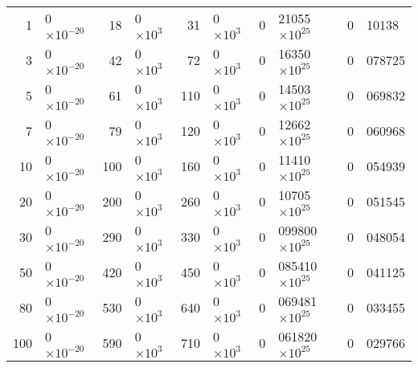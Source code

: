 \documentclass{warpdoc}
\begin{document}
\begin{table}
\begin{threeparttable}
\begin{tabular}{r@{.}lr@{.}lr@{.}lr@{.}lr@{.}l}
     1&0 $\times 10^{-20}$  & 18&0 $\times 10^{3}$  & 31&0 $\times 10^{3}$ &  0&21055 $\times 10^{25}$ &  0&10138\\
     3&0 $\times 10^{-20}$  & 42&0 $\times 10^{3}$  & 72&0 $\times 10^{3}$ &  0&16350 $\times 10^{25}$ &  0&078725\\
     5&0 $\times 10^{-20}$  & 61&0 $\times 10^{3}$  &110&0 $\times 10^{3}$ &  0&14503 $\times 10^{25}$ &  0&069832\\
     7&0 $\times 10^{-20}$  & 79&0 $\times 10^{3}$  &120&0 $\times 10^{3}$ &  0&12662 $\times 10^{25}$ &  0&060968\\
    10&0 $\times 10^{-20}$  &100&0 $\times 10^{3}$  &160&0 $\times 10^{3}$ &  0&11410 $\times 10^{25}$  &  0&054939\\
    20&0 $\times 10^{-20}$  &200&0 $\times 10^{3}$  &260&0 $\times 10^{3}$ &  0&10705 $\times 10^{25}$  &  0&051545\\
    30&0 $\times 10^{-20}$  &290&0 $\times 10^{3}$  &330&0 $\times 10^{3}$ &  0&099800 $\times 10^{25}$  &  0&048054\\
    50&0 $\times 10^{-20}$  &420&0 $\times 10^{3}$  &450&0 $\times 10^{3}$ &  0&085410 $\times 10^{25}$  &  0&041125\\
    80&0 $\times 10^{-20}$  &530&0 $\times 10^{3}$  &640&0 $\times 10^{3}$ &  0&069481 $\times 10^{25}$  &  0&033455\\
   100&0 $\times 10^{-20}$  &590&0 $\times 10^{3}$  &710&0 $\times 10^{3}$ &  0&061820 $\times 10^{25}$   &  0&029766\\             
    \bottomrule
    \end{tabular}
   \end{threeparttable}
\end{table}
%
\end{document}
